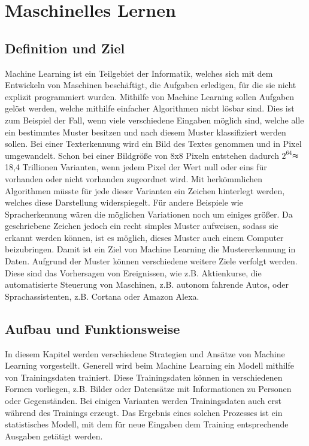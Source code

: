 \chapter{Maschinelles Lernen}
\label{chap:maschinellesLernen}
\chapterauthor{\authorMarco}
\section{Definition und Ziel}
\label{sec:definitionZiel}
Machine Learning ist ein Teilgebiet der Informatik, welches sich mit dem Entwickeln von Maschinen beschäftigt, die Aufgaben erledigen, für die sie nicht explizit programmiert wurden.
Mithilfe von Machine Learning sollen Aufgaben gelöst werden, welche mithilfe einfacher Algorithmen nicht lösbar sind. Dies ist zum Beispiel der Fall, wenn viele verschiedene Eingaben möglich sind, welche alle ein bestimmtes Muster besitzen und nach diesem Muster klassifiziert werden sollen. Bei einer Texterkennung wird ein Bild des Textes genommen und in Pixel umgewandelt. Schon bei einer Bildgröße von 8x8 Pixeln entstehen dadurch $2^{64}$$\thickapprox$18,4 Trillionen Varianten, wenn jedem Pixel der Wert null oder eins für vorhanden oder nicht vorhanden zugeordnet wird. Mit herkömmlichen Algorithmen müsste für jede dieser Varianten ein Zeichen hinterlegt werden, welches diese Darstellung widerspiegelt. Für andere Beispiele wie Spracherkennung wären die möglichen Variationen noch um einiges größer. Da geschriebene Zeichen jedoch ein recht simples Muster aufweisen, sodass sie erkannt werden können, ist es möglich, dieses Muster auch einem Computer beizubringen. Damit ist ein Ziel von Machine Learning die Mustererkennung in Daten.
Aufgrund der Muster können verschiedene weitere Ziele verfolgt werden. Diese sind das Vorhersagen von Ereignissen, wie z.B. Aktienkurse, die automatisierte Steuerung von Maschinen, z.B. autonom fahrende Autos, oder Sprachassistenten, z.B. Cortana oder Amazon Alexa.

\section{Aufbau und Funktionsweise}
\label{sec:aufbauFunktionsweise}
In diesem Kapitel werden verschiedene Strategien und Ansätze von Machine Learning vorgestellt. Generell wird beim Machine Learning ein Modell mithilfe von Trainingsdaten trainiert. Diese Trainingsdaten können in verschiedenen Formen vorliegen, z.B. Bilder oder Datensätze mit Informationen zu Personen oder Gegenständen. Bei einigen Varianten werden Trainingsdaten auch erst während des Trainings erzeugt.
Das Ergebnis eines solchen Prozesses ist ein statistisches Modell, mit dem für neue Eingaben dem Training entsprechende Ausgaben getätigt werden.


